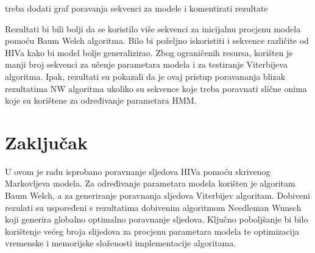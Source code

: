 \documentclass[times, utf8, seminar, numeric]{fer}
\begin{document}
treba dodati graf poravanja sekvenci za modele i komentirati rezultate

Rezultati bi bili bolji da se koristilo više sekvenci za inicijalnu procjenu modela pomoću Baum Welch algoritma. Bilo bi poželjno iskoristiti i sekvence različite od HIVa kako bi model bolje generalizirao. Zbog ograničenih resursa, korišten je manji broj sekvenci za učenje parametara modela i za testiranje Viterbijeva algoritma. Ipak, rezultati su pokazali da je ovaj pristup poravananja blizak rezultatima NW algoritma ukoliko su sekvence koje treba poravnati slične onima koje su korištene za određivanje parametara HMM.

\chapter{Zaključak}
U ovom je radu isprobano poravnanje sljedova HIVa pomoću skrivenog Markovljeva modela. Za određivanje parametara modela korišten je algoritam Baum Welch, a za generiranje poravnanja sljedova Viterbijev algoritam. Dobiveni rezulati su uspoređeni s rezultatima dobivenim algoritmom Needleman Wunsch koji generira globalno optimalno poravnanje sljedova. Ključno poboljšanje bi bilo korištenje većeg broja slijedova za procjenu parametara modela te optimizacija vremenske i memorijske složenosti implementacije algoritama.
 
\nocite{*}


\end{document}
